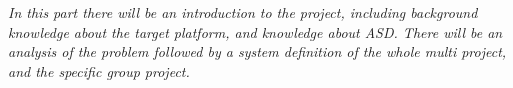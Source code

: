 \textit{In this part there will be an introduction to the project, including background knowledge about the target platform, and knowledge about ASD. There will be an analysis of the problem followed by a system definition of the whole multi project, and the specific group project.}